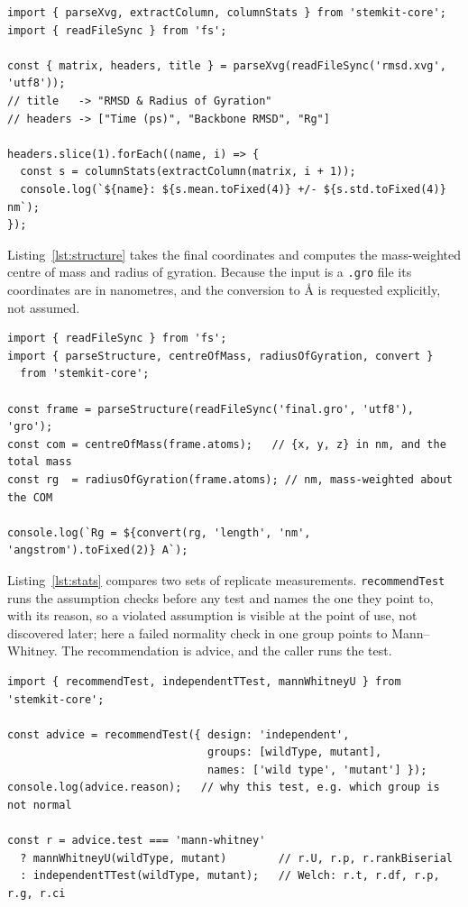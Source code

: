 \documentclass[11pt,a4paper]{article}
\begin{document}
\begin{lstlisting}[caption={Parsing a GROMACS RMSD trajectory and summarising
each series.},label={lst:xvg}]
import { parseXvg, extractColumn, columnStats } from 'stemkit-core';
import { readFileSync } from 'fs';

const { matrix, headers, title } = parseXvg(readFileSync('rmsd.xvg', 'utf8'));
// title   -> "RMSD & Radius of Gyration"
// headers -> ["Time (ps)", "Backbone RMSD", "Rg"]

headers.slice(1).forEach((name, i) => {
  const s = columnStats(extractColumn(matrix, i + 1));
  console.log(`${name}: ${s.mean.toFixed(4)} +/- ${s.std.toFixed(4)} nm`);
});
\end{lstlisting}

Listing~\ref{lst:structure} takes the final coordinates and computes the
mass-weighted centre of mass and radius of gyration. Because the input is a
\texttt{.gro} file its coordinates are in nanometres, and the conversion to
\si{\angstrom} is requested explicitly, not assumed.

\begin{lstlisting}[caption={Geometry of the final frame, with an explicit unit
conversion.},label={lst:structure}]
import { readFileSync } from 'fs';
import { parseStructure, centreOfMass, radiusOfGyration, convert }
  from 'stemkit-core';

const frame = parseStructure(readFileSync('final.gro', 'utf8'), 'gro');
const com = centreOfMass(frame.atoms);   // {x, y, z} in nm, and the total mass
const rg  = radiusOfGyration(frame.atoms); // nm, mass-weighted about the COM

console.log(`Rg = ${convert(rg, 'length', 'nm', 'angstrom').toFixed(2)} A`);
\end{lstlisting}

Listing~\ref{lst:stats} compares two sets of replicate measurements.
\texttt{recommendTest} runs the assumption checks before any test and names
the one they point to, with its reason, so a violated assumption is visible at
the point of use, not discovered later; here a failed normality check in
one group points to Mann--Whitney. The recommendation is advice, and the caller
runs the test.

\begin{lstlisting}[caption={A replicate comparison guided by the assumption
checks.},label={lst:stats}]
import { recommendTest, independentTTest, mannWhitneyU } from 'stemkit-core';

const advice = recommendTest({ design: 'independent',
                               groups: [wildType, mutant],
                               names: ['wild type', 'mutant'] });
console.log(advice.reason);   // why this test, e.g. which group is not normal

const r = advice.test === 'mann-whitney'
  ? mannWhitneyU(wildType, mutant)        // r.U, r.p, r.rankBiserial
  : independentTTest(wildType, mutant);   // Welch: r.t, r.df, r.p, r.g, r.ci
\end{lstlisting}
\end{document}
